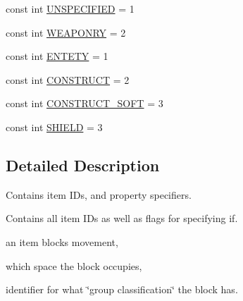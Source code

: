 \begin{DoxyCompactItemize}
\item 
const int \hyperlink{namespaceblocks_a6bdd8efa1c06420d581b18dd63651633}{U\-N\-S\-P\-E\-C\-I\-F\-I\-E\-D} = 1
\item 
const int \hyperlink{namespaceblocks_a60a02114e9d8f1775ff2cd109606f78f}{W\-E\-A\-P\-O\-N\-R\-Y} = 2
\item 
const int \hyperlink{namespaceblocks_a4d5910f765824bac56f2737496e51a7d}{E\-N\-T\-E\-T\-Y} = 1
\item 
const int \hyperlink{namespaceblocks_a94050edf77a38898d8d81e0621a5cd62}{C\-O\-N\-S\-T\-R\-U\-C\-T} = 2
\item 
const int \hyperlink{namespaceblocks_a8a40b228670ab6718cd7678691a660e0}{C\-O\-N\-S\-T\-R\-U\-C\-T\-\_\-\-S\-O\-F\-T} = 3
\item 
const int \hyperlink{namespaceblocks_a2dbfa556ff23144609daefecf564ddb0}{S\-H\-I\-E\-L\-D} = 3
\end{DoxyCompactItemize}


\subsection{Detailed Description}
Contains item I\-Ds, and property specifiers.

Contains all item I\-Ds as well as flags for specifying if. 
\begin{DoxyItemize}
\item an item blocks movement,
\item which space the block occupies,
\item identifier for what \char`\"{}group classification\char`\"{} the block has. 
\end{DoxyItemize}

